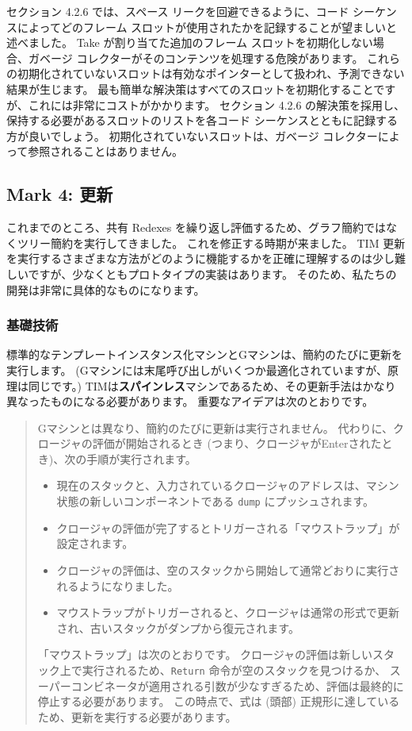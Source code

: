 \documentclass{jarticle}
\begin{document}
セクション 4.2.6 では、スペース リークを回避できるように、コード シーケンスによってどのフレーム スロットが使用されたかを記録することが望ましいと述べました。
Take が割り当てた追加のフレーム スロットを初期化しない場合、ガベージ コレクターがそのコンテンツを処理する危険があります。
これらの初期化されていないスロットは有効なポインターとして扱われ、予測できない結果が生じます。
最も簡単な解決策はすべてのスロットを初期化することですが、これには非常にコストがかかります。
セクション 4.2.6 の解決策を採用し、保持する必要があるスロットのリストを各コード シーケンスとともに記録する方が良いでしょう。
初期化されていないスロットは、ガベージ コレクターによって参照されることはありません。

\newpage

\subsection{Mark 4: 更新}

これまでのところ、共有 Redexes を繰り返し評価するため、グラフ簡約ではなくツリー簡約を実行してきました。
これを修正する時期が来ました。
TIM 更新を実行するさまざまな方法がどのように機能するかを正確に理解するのは少し難しいですが、少なくともプロトタイプの実装はあります。
そのため、私たちの開発は非常に具体的なものになります。

\subsubsection{基礎技術}

標準的なテンプレートインスタンス化マシンとGマシンは、簡約のたびに更新を実行します。
(Gマシンには末尾呼び出しがいくつか最適化されていますが、原理は同じです。)
TIMは\textbf{スパインレス}マシンであるため、その更新手法はかなり異なったものになる必要があります。
重要なアイデアは次のとおりです。

\begin{quote}
	Gマシンとは異なり、簡約のたびに更新は実行されません。
	代わりに、クロージャの評価が開始されるとき (つまり、クロージャがEnterされたとき)、次の手順が実行されます。

	\begin{itemize}
		\item 現在のスタックと、入力されているクロージャのアドレスは、マシン状態の新しいコンポーネントである \texttt{dump} にプッシュされます。
		\item クロージャの評価が完了するとトリガーされる「マウストラップ」が設定されます。
		\item クロージャの評価は、空のスタックから開始して通常どおりに実行されるようになりました。
		\item マウストラップがトリガーされると、クロージャは通常の形式で更新され、古いスタックがダンプから復元されます。
	\end{itemize}

	「マウストラップ」は次のとおりです。
	クロージャの評価は新しいスタック上で実行されるため、\texttt{Return} 命令が空のスタックを見つけるか、
	スーパーコンビネータが適用される引数が少なすぎるため、評価は最終的に停止する必要があります。
	この時点で、式は (頭部) 正規形に達しているため、更新を実行する必要があります。
\end{quote}
\end{document}
